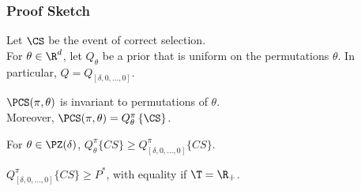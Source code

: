 {\begin{frame}
  \frametitle{Proof Sketch}
  Let $\CS$ be the event of correct selection. \\
  For $\theta\in\R^d$, let $Q_\theta$ be a prior that is uniform on the permutations $\theta$.
  In particular, $Q = Q_{[\delta,0,\ldots,0]}$.

  \begin{lemma}[Symmetry]
    $\PCS(\pi,\theta)$ is invariant to permutations of $\theta$.  \\ Moreover, $\PCS(\pi,\theta) = Q^\pi_\theta\left\{ \CS \right\}$.
  \end{lemma}


  \begin{lemma}[Monotonicity]
    For $\theta\in\PZ(\delta)$, 
    $Q^\pi_\theta\{CS\} \ge Q^\pi_{[\delta,0,\ldots,0]}\{CS\}$.
  \end{lemma}

   \begin{lemma}
    $Q^\pi_{[\delta,0,\ldots,0]}\{CS\} \ge P^*$, with equality if $\T=\R_+$.
   \end{lemma}
\end{frame}



}
